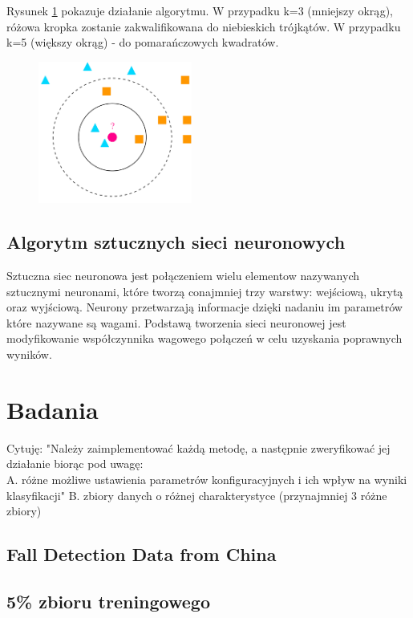 \documentclass[a4paper,11pt]{article}
\begin{document}
Rysunek \ref{fig:knn} pokazuje działanie algorytmu. W przypadku k=3 (mniejszy okrąg), różowa kropka zostanie zakwalifikowana do niebieskich trójkątów. W przypadku k=5 (większy okrąg) - do pomarańczowych kwadratów.

\begin{figure}[!htbp]
    	\centering
    	\includegraphics[width=0.45\textwidth]{images/knn.png}
    	\caption{}
    	\label{fig:knn}
\end{figure}

\subsection{Algorytm sztucznych sieci neuronowych}
Sztuczna siec neuronowa  jest połączeniem wielu elementow nazywanych sztucznymi neuronami, które tworzą conajmniej trzy warstwy: wejściową, ukrytą oraz wyjściową. Neurony przetwarzają informacje dzięki nadaniu im parametrów które nazywane są wagami. Podstawą tworzenia sieci neuronowej jest modyfikowanie współczynnika wagowego połączeń w celu uzyskania poprawnych wyników.

\section{Badania}
\color{red}
Cytuję: "Należy zaimplementować każdą metodę, a następnie zweryfikować jej działanie biorąc pod uwagę:\\
A. różne możliwe ustawienia parametrów konfiguracyjnych i ich wpływ na wyniki klasyfikacji"
B. zbiory danych o różnej charakterystyce (przynajmniej 3 różne zbiory)
\color{black}

\subsection{Fall Detection Data from China}
\subsection*{5\% zbioru treningowego}
\end{document}
